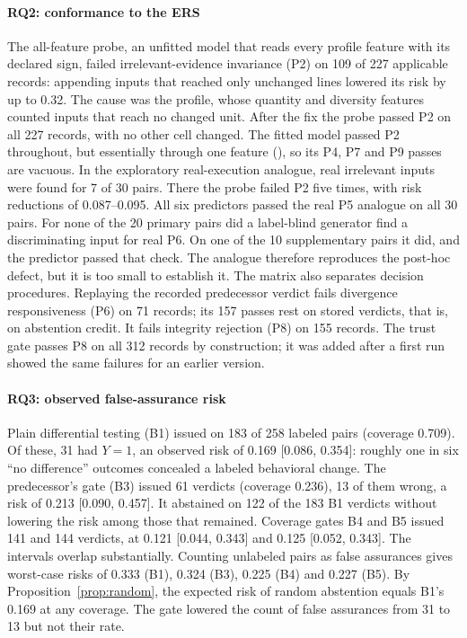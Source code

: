 \documentclass{ieeeaccess}
\begin{document}
\paragraph*{RQ2: conformance to the ERS} The all-feature probe, an unfitted model that reads every profile feature with its declared sign, failed irrelevant-evidence invariance (P2) on 109 of 227 applicable records: appending inputs that reached only unchanged lines lowered its risk by up to 0.32. The cause was the profile, whose quantity and diversity features counted inputs that reach no changed unit. After the fix the probe passed P2 on all 227 records, with no other cell changed. The fitted model passed P2 throughout, but essentially through one feature (), so its P4, P7 and P9 passes are vacuous. In the exploratory real-execution analogue, real irrelevant inputs were found for 7 of 30 pairs. There the probe failed P2 five times, with risk reductions of 0.087--0.095. All six predictors passed the real P5 analogue on all 30 pairs. For none of the 20 primary pairs did a label-blind generator find a discriminating input for real P6. On one of the 10 supplementary pairs it did, and the predictor passed that check. The analogue therefore reproduces the post-hoc defect, but it is too small to establish it. The matrix also separates decision procedures. Replaying the recorded predecessor verdict fails divergence responsiveness (P6) on 71 records; its 157 passes rest on stored \INS{} verdicts, that is, on abstention credit. It fails integrity rejection (P8) on 155 records. The trust gate passes P8 on all 312 records by construction; it was added after a first run showed the same failures for an earlier version.

\paragraph*{RQ3: observed false-assurance risk}\label{sec:res-rq3} Plain differential testing (B1) issued \NDO{} on 183 of 258 labeled pairs (coverage 0.709). Of these, 31 had $Y{=}1$, an observed risk of 0.169 [0.086, 0.354]: roughly one in six ``no difference'' outcomes concealed a labeled behavioral change. The predecessor's gate (B3) issued 61 verdicts (coverage 0.236), 13 of them wrong, a risk of 0.213 [0.090, 0.457]. It abstained on 122 of the 183 B1 verdicts without lowering the risk among those that remained. Coverage gates B4 and B5 issued 141 and 144 verdicts, at 0.121 [0.044, 0.343] and 0.125 [0.052, 0.343]. The intervals overlap substantially. Counting unlabeled \NDO{} pairs as false assurances gives worst-case risks of 0.333 (B1), 0.324 (B3), 0.225 (B4) and 0.227 (B5). By Proposition~\ref{prop:random}, the expected risk of random abstention equals B1's 0.169 at any coverage. The gate lowered the count of false assurances from 31 to 13 but not their rate.
\end{document}
